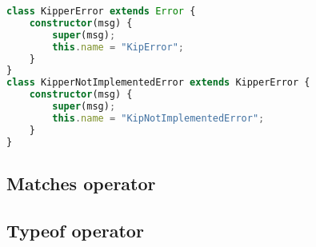 \begin{lstlisting}[language=Typescript,caption=Kipper error types,label=lst:implementation:kippererrortypes]
class KipperError extends Error {
	constructor(msg) {
		super(msg);
		this.name = "KipError";
	}
}
class KipperNotImplementedError extends KipperError {
	constructor(msg) {
		super(msg);
		this.name = "KipNotImplementedError";
	}
}
\end{lstlisting}

\subsection{Matches operator}
\label{subsec:matches}

\subsection{Typeof operator}
\label{subsec:typeof}
